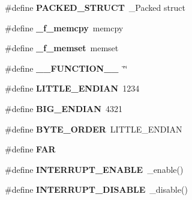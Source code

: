 \begin{DoxyCompactItemize}
\item 
\hypertarget{group__hal__dos_gafa9179779c676eed926a35c4ab5fe5b5}{\#define {\bfseries P\-A\-C\-K\-E\-D\-\_\-\-S\-T\-R\-U\-C\-T}~\-\_\-\-Packed struct}\label{group__hal__dos_gafa9179779c676eed926a35c4ab5fe5b5}

\item 
\hypertarget{group__hal__dos_ga3ee5b5bde5321e97420753cf13ce9c1b}{\#define {\bfseries \-\_\-f\-\_\-memcpy}~memcpy}\label{group__hal__dos_ga3ee5b5bde5321e97420753cf13ce9c1b}

\item 
\hypertarget{group__hal__dos_ga210604a4d70c1421599afca049c8dc55}{\#define {\bfseries \-\_\-f\-\_\-memset}~memset}\label{group__hal__dos_ga210604a4d70c1421599afca049c8dc55}

\item 
\hypertarget{group__hal__dos_ga828bb1dfda1afd67ca795075903d227d}{\#define {\bfseries \-\_\-\-\_\-\-F\-U\-N\-C\-T\-I\-O\-N\-\_\-\-\_\-}~\char`\"{}\char`\"{}}\label{group__hal__dos_ga828bb1dfda1afd67ca795075903d227d}

\item 
\hypertarget{group__hal__dos_ga8782a401fbf55261460863fc2f8df1ce}{\#define {\bfseries L\-I\-T\-T\-L\-E\-\_\-\-E\-N\-D\-I\-A\-N}~1234}\label{group__hal__dos_ga8782a401fbf55261460863fc2f8df1ce}

\item 
\hypertarget{group__hal__dos_ga23eb5e058a210efdde3d64e69679fafa}{\#define {\bfseries B\-I\-G\-\_\-\-E\-N\-D\-I\-A\-N}~4321}\label{group__hal__dos_ga23eb5e058a210efdde3d64e69679fafa}

\item 
\hypertarget{group__hal__dos_ga1771b7fb65ee640524d0052f229768c3}{\#define {\bfseries B\-Y\-T\-E\-\_\-\-O\-R\-D\-E\-R}~L\-I\-T\-T\-L\-E\-\_\-\-E\-N\-D\-I\-A\-N}\label{group__hal__dos_ga1771b7fb65ee640524d0052f229768c3}

\item 
\hypertarget{group__hal__dos_gaef060b3456fdcc093a7210a762d5f2ed}{\#define {\bfseries F\-A\-R}}\label{group__hal__dos_gaef060b3456fdcc093a7210a762d5f2ed}

\item 
\hypertarget{group__hal__dos_gacf43057fc38f77d20456c074909ba772}{\#define {\bfseries I\-N\-T\-E\-R\-R\-U\-P\-T\-\_\-\-E\-N\-A\-B\-L\-E}~\-\_\-enable()}\label{group__hal__dos_gacf43057fc38f77d20456c074909ba772}

\item 
\hypertarget{group__hal__dos_ga658c3ad175b50000ac44b3b9ea836d1a}{\#define {\bfseries I\-N\-T\-E\-R\-R\-U\-P\-T\-\_\-\-D\-I\-S\-A\-B\-L\-E}~\-\_\-disable()}\label{group__hal__dos_ga658c3ad175b50000ac44b3b9ea836d1a}


\end{DoxyCompactItemize}
